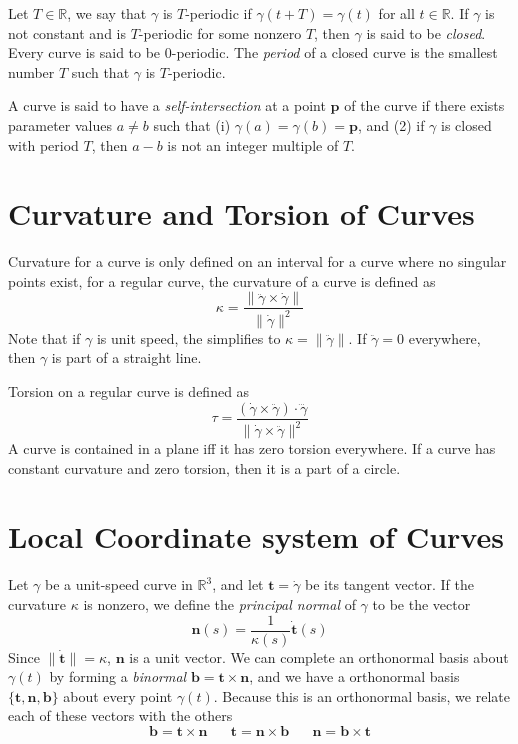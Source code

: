 \documentclass[12pt]{article}
\begin{document}
\begin{multicols*}{2}
Let $T \in \mathbb{R}$, we say that $\gamma$ is $T$-periodic if $\gamma(t+T) = \gamma(t)$ for all $t \in \mathbb{R}$. If $\gamma$ is not constant and is $T$-periodic for some nonzero $T$, then $\gamma$ is said to be \textit{closed}. Every curve is said to be 0-periodic. The \textit{period} of a closed curve is the smallest number $T$ such that $\gamma$ is $T$-periodic.

A curve is said to have a \textit{self-intersection} at a point $\mathbf{p}$ of the curve if there exists parameter values $a \neq b$ such that (i) $\gamma(a) = \gamma(b) = \mathbf{p}$, and (2) if $\gamma$ is closed with period $T$, then $a - b$ is not an integer multiple of $T$.

\section*{Curvature and Torsion of Curves}

Curvature for a curve is only defined on an interval for a curve where no singular points exist, for a regular curve, the curvature of a curve is defined as \[\kappa = \frac{\lVert\ddot{\gamma} \times \dot{\gamma}\rVert}{\lVert\dot{\gamma}\rVert^2}\] Note that if $\gamma$ is unit speed, the simplifies to $\kappa = \lVert \ddot{\gamma} \rVert$. If $\ddot{\gamma} = 0$ everywhere, then $\gamma$ is part of a straight line.

Torsion on a regular curve is defined as \[\tau = \frac{(\dot{\gamma} \times \ddot{\gamma})\cdot\dddot{\gamma}}{\lVert \dot{\gamma} \times \ddot{\gamma}\rVert ^2}\] A curve is contained in a plane iff it has zero torsion everywhere. If a curve has constant curvature and zero torsion, then it is a part of a circle.

\section*{Local Coordinate system of Curves}

Let $\gamma$ be a unit-speed curve in $\mathbb{R}^3$, and let $\mathbf{t} = \dot{\gamma}$ be its tangent vector. If the curvature $\kappa$ is nonzero, we define the \textit{principal normal} of $\gamma$ to be the vector \[\mathbf{n}(s) = \frac{1}{\kappa(s)}\dot{\mathbf{t}}(s)\] Since $\lVert \dot{\mathbf{t}}\rVert = \kappa$, $\mathbf{n}$ is a unit vector. We can complete an orthonormal basis about $\gamma(t)$ by forming a \textit{binormal} $\mathbf{b} = \mathbf{t} \times \mathbf{n}$, and we have a orthonormal basis $\{\mathbf{t}, \mathbf{n}, \mathbf{b}\}$ about every point $\gamma(t)$. Because this is an orthonormal basis, we relate each of these vectors with the others\[\mathbf{b} = \mathbf{t} \times \mathbf{n}\;\;\;\;\;\;\mathbf{t} = \mathbf{n} \times \mathbf{b}\;\;\;\;\;\;\mathbf{n} = \mathbf{b} \times \mathbf{t}\]


\end{multicols*}
\end{document}
